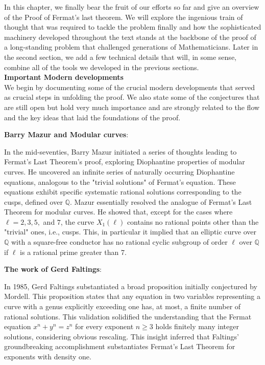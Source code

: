 In this chapter, we finally bear the fruit of our efforts so far and give an overview of the Proof of Fermat's last theorem. We will explore the ingenious train of thought that was required to tackle the problem finally and how the sophisticated machinery developed throughout the text stands at the backbone of the proof of a long-standing problem that challenged generations of Mathematicians.  Later in the second section, we add a few technical details that will, in some sense, combine all of the tools we developed in the previous sections.  \\
\textbf{Important Modern developments}\\   
We begin by documenting some of the crucial modern developments that served as crucial steps in unfolding the proof. We also state some of the conjectures that are still open but hold very much importance and are strongly related to the flow and the key ideas that laid the foundations of the proof. \\


\begin{center}
\textbf{Barry Mazur and Modular curves}:\\   
\end{center}
  

In the mid-seventies, Barry Mazur initiated a series of thoughts leading to Fermat's Last Theorem's proof, exploring Diophantine properties of modular curves. He uncovered an infinite series of naturally occurring Diophantine equations, analogous to the "trivial solutions" of Fermat's equation. These equations exhibit specific systematic rational solutions corresponding to the cusps, defined over \(\mathbb{Q}\).
Mazur essentially resolved the analogue of Fermat's Last Theorem for modular curves. He showed that, except for the cases where \(\ell = 2, 3, 5,\) and \(7\), the curve \(X_{1}(\ell)\) contains no rational points other than the "trivial" ones, i.e., cusps. This, in particular it implied that an elliptic curve over \(\mathbb{Q}\) with a square-free conductor has no rational cyclic subgroup of order \(\ell\) over \(\mathbb{Q}\) if $\ell$ is a rational prime greater than 7.\\

  \begin{center}
\textbf{The work of Gerd Faltings}: \\    
\end{center}
  


In 1985, Gerd Faltings substantiated a broad proposition initially conjectured by Mordell. This proposition states that any equation in two variables representing a curve with a genus explicitly exceeding one has, at most, a finite number of rational solutions. This validation solidified the understanding that the Fermat equation \(x^{n}+y^{n}=z^{n}\) for every exponent \(n \geq 3\) holds finitely many integer solutions, considering obvious rescaling. This insight inferred that Faltings' groundbreaking accomplishment substantiates Fermat's Last Theorem for exponents with density one.

